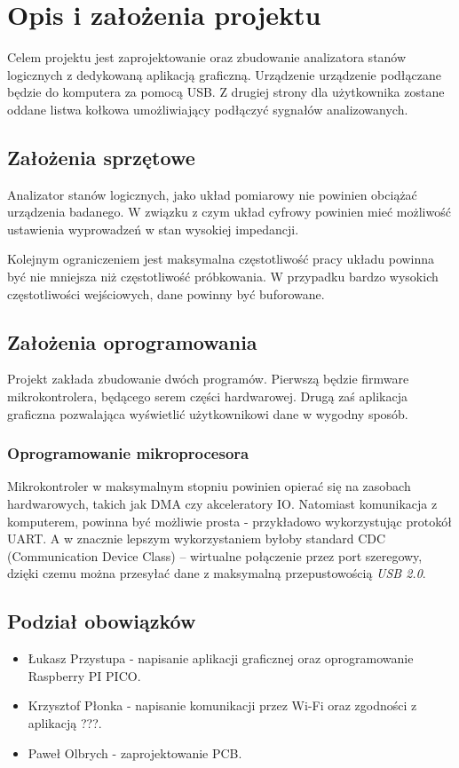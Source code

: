\section{Opis i założenia projektu}
    Celem projektu jest zaprojektowanie oraz zbudowanie analizatora stanów logicznych z dedykowaną aplikacją graficzną.
    Urządzenie urządzenie podłączane będzie do komputera za pomocą USB.
    Z drugiej strony dla użytkownika zostane oddane listwa kołkowa umożliwiający podłączyć sygnałów analizowanych.

\subsection{Założenia sprzętowe}
    Analizator stanów logicznych, jako układ pomiarowy nie powinien obciążać urządzenia badanego.
    W związku z czym układ cyfrowy powinien mieć możliwość ustawienia wyprowadzeń w stan wysokiej impedancji.

    Kolejnym ograniczeniem jest maksymalna częstotliwość pracy układu powinna być nie mniejsza niż częstotliwość próbkowania.
    W przypadku bardzo wysokich częstotliwości wejściowych, dane powinny być buforowane.

\subsection{Założenia oprogramowania}
    Projekt zakłada zbudowanie dwóch programów.
    Pierwszą będzie firmware mikrokontrolera, będącego serem części hardwarowej.
    Drugą zaś aplikacja graficzna pozwalająca wyświetlić użytkownikowi dane w wygodny sposób.

    \subsubsection{Oprogramowanie mikroprocesora}
        Mikrokontroler w maksymalnym stopniu powinien opierać się na zasobach hardwarowych, takich jak DMA czy akceleratory IO.
        Natomiast komunikacja z komputerem, powinna być możliwie prosta - przykładowo wykorzystując protokół UART.
        A w znacznie lepszym wykorzystaniem byłoby standard CDC (Communication Device Class) -- wirtualne połączenie przez port szeregowy,
        dzięki czemu można przesyłać dane z maksymalną przepustowością \textit{USB 2.0}.


\subsection{Podział obowiązków}
    \begin{itemize}
        \item Łukasz Przystupa  - napisanie aplikacji graficznej oraz oprogramowanie Raspberry PI PICO.
        \item Krzysztof Płonka  - napisanie komunikacji przez Wi-Fi oraz zgodności z aplikacją ???. %
        \item Paweł Olbrych     - zaprojektowanie PCB.
    \end{itemize}
